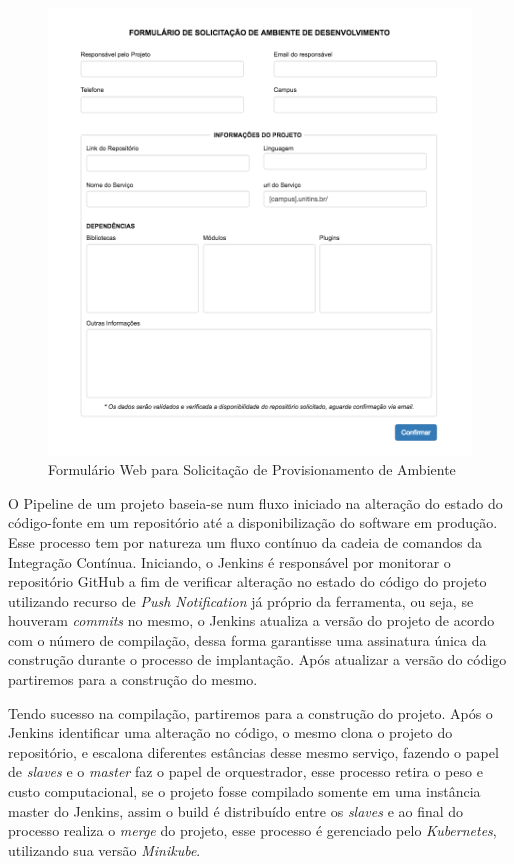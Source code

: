 \begin{figure}[htb]
	\centering
	\includegraphics[width=1\linewidth]{imagens/formulario}
	\caption{Formulário Web para Solicitação de Provisionamento de Ambiente}
	\label{fig:formulario}
	
\end{figure}


O Pipeline de um projeto baseia-se num fluxo iniciado na alteração do estado do código-fonte em um repositório até a disponibilização do software em produção. Esse processo tem por natureza um fluxo contínuo da cadeia de comandos da Integração Contínua. Iniciando, o Jenkins é responsável por monitorar o repositório GitHub a fim de verificar alteração no estado do código do projeto utilizando recurso de \textit{Push Notification} já próprio da ferramenta, ou seja, se houveram \textit{commits} no mesmo, o Jenkins atualiza a versão do projeto de acordo com o número de compilação, dessa forma garantisse uma assinatura única da construção durante o processo de implantação. Após atualizar a versão do código partiremos para a construção do mesmo.

Tendo sucesso na compilação, partiremos para a construção do projeto. Após o Jenkins identificar uma alteração no código, o mesmo clona o projeto do repositório, e escalona diferentes estâncias desse mesmo serviço, fazendo o papel de \textit{slaves} e o \textit{master} faz o papel de orquestrador, esse processo retira o peso e custo computacional, se o projeto fosse compilado somente em uma instância master do Jenkins, assim o build é distribuído entre os \textit{slaves} e ao final do processo realiza o \textit{merge} do projeto, esse processo é gerenciado pelo \textit{Kubernetes}, utilizando sua versão \textit{Minikube}.

